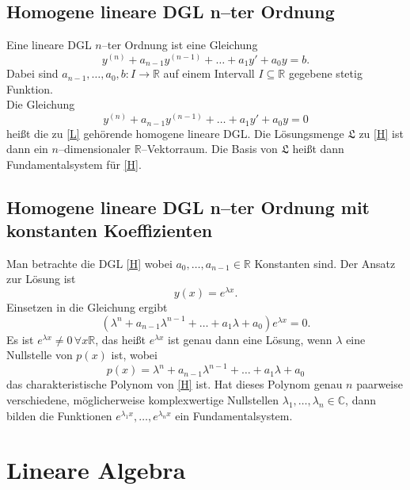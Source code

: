\documentclass[a4paper,12pt]{article}
\begin{document}
\subsection{Homogene lineare DGL n--ter Ordnung}
Eine lineare DGL $n$--ter Ordnung ist eine Gleichung
\[ 
        y^{\left(n\right)}+a_{n-1}y^{\left(n-1\right)}+\hdots +a_1y'+a_0y=b \tag{L}\label{L} %
.\] 
Dabei sind $a_{n-1},\hdots ,a_0,b:I\rightarrow \mathbb{R}$ auf einem Intervall $I\subseteq \mathbb{R}$ gegebene stetig Funktion.\\
Die Gleichung
\[ 
        y^{\left(n\right)}+a_{n-1}y^{\left(n-1\right)}+\hdots +a_1y'+a_0y=0\tag{H}\label{H} %
\] 
heißt die zu \eqref{L} gehörende homogene lineare DGL. Die Lösungsmenge $\mathfrak{L}$ zu \eqref{H} ist dann ein $n$--dimensionaler $\mathbb{R}$--Vektorraum. Die Basis von $\mathfrak{L}$ heißt dann Fundamentalsystem für \eqref{H}.

\subsection{Homogene lineare DGL n--ter Ordnung mit konstanten Koeffizienten}
Man betrachte die DGL \eqref{H} wobei $a_0,\hdots ,a_{n-1} \in \mathbb{R}$ Konstanten sind. Der Ansatz zur Lösung ist 
\[ 
        y\left(x\right)=e^{\lambda x}
.\] 
Einsetzen in die Gleichung ergibt
\[ 
        \left(\lambda ^{n}+a_{n-1}\lambda ^{n-1}+\hdots +a_1\lambda +a_0\right)e^{\lambda x}=0
.\] 
Es ist $e^{\lambda x}\neq 0\,\forall x\mathbb{R}$, das heißt $e^{\lambda x}$ ist genau dann eine Lösung, wenn $\lambda $ eine Nullstelle von $p\left(x\right)$ ist, wobei
\[ 
        p\left(x\right)=\lambda ^n+a_{n-1}\lambda ^{n-1}+\hdots +a_1\lambda +a_0
\] 
das charakteristische Polynom von \eqref{H} ist. Hat dieses Polynom genau $n$ paarweise verschiedene, möglicherweise komplexwertige Nullstellen $\lambda _1,\hdots ,\lambda _n  \in \mathbb{C}$, dann bilden die Funktionen $e^{\lambda _1x},\hdots ,e^{\lambda _nx}$ ein Fundamentalsystem. 


\section*{Lineare Algebra}
\end{document}
